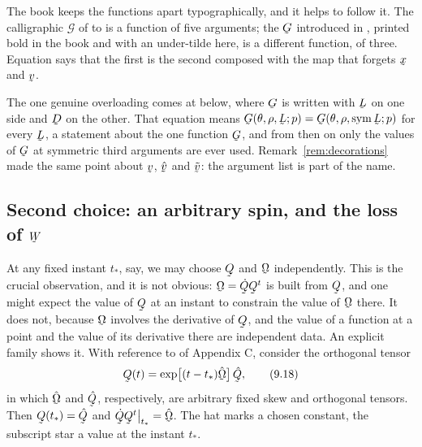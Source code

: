 \begin{remark}\label{rem:ch9samelet}
The book keeps the functions apart typographically, and it helps to
follow it. The calligraphic $\mathcal{G}$ of  to  is
a function of five arguments; the $\bG$ introduced in ,
printed bold in the book and with an under-tilde here, is a different
function, of three. Equation  says that the first is the
second composed with the map that forgets $\bx$ and $\bv$.

The one genuine overloading comes at  below, where $\bG$ is
written with $\bL$ on one side and $\bD$ on the other. That equation
means $\bG(\theta,\rho,\bL;p)=\bG(\theta,\rho,\Sym\bL;p)$ for every
$\bL$, a statement about the one function $\bG$, and from then on only
the values of $\bG$ at symmetric third arguments are ever used.
Remark~\ref{rem:decorations} made the same point about $\bv$,
$\hat\bv$ and $\tilde\bv$: the argument list is part of the name.
\end{remark}

\subsection*{Second choice: an arbitrary spin, and the loss of $\bW$}

At any fixed instant $t_{*}$, say, we may choose $\bQ$ and $\bOm$
independently. This is the crucial observation, and it is not obvious:
$\bOm=\dot\bQ\bQ^{t}$ is built from $\bQ$, and one might expect the
value of $\bQ$ at an instant to constrain the value of $\bOm$ there. It
does not, because $\bOm$ involves the derivative of $\bQ$, and the value
of a function at a point and the value of its derivative there are
independent data. An explicit family shows it. With reference to
 of Appendix C, consider the orthogonal tensor
\begin{equation}
   \bQ(t)=\exp\!\big[(t-t_{*})\hat{\bOm}\big]\,\hat\bQ,
   \tag{9.18}\label{eq:9.18}
\end{equation}
in which $\hat{\bOm}$ and $\hat\bQ$, respectively, are arbitrary fixed
skew and orthogonal tensors. Then $\bQ(t_{*})=\hat\bQ$ and
$\dot\bQ\bQ^{t}\rest{t_{*}}=\hat{\bOm}$. The hat marks a chosen
constant, the subscript star a value at the instant $t_{*}$.

